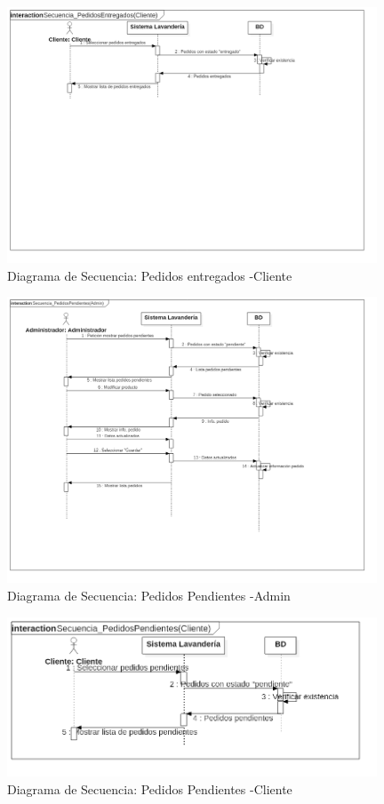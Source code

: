 \begin{figure}[htb]
\begin{center}
\includegraphics[width=11cm]{./imagenes/diagramas/Secuencia_PedidosEntregados(Cliente).png}
\end{center}
\caption{Diagrama de Secuencia: Pedidos entregados -Cliente}
\end{figure}


\begin{figure}[htb]
\begin{center}
\includegraphics[width=11cm]{./imagenes/diagramas/Secuencia_PedidosPendientes(Admin).png}
\end{center}
\caption{Diagrama de Secuencia: Pedidos Pendientes -Admin }
\end{figure}


\begin{figure}[htb]
\begin{center}
\includegraphics[width=11cm]{./imagenes/diagramas/Secuencia_PedidosPendientes(Cliente).png}
\end{center}
\caption{Diagrama de Secuencia: Pedidos Pendientes -Cliente}
\end{figure}



